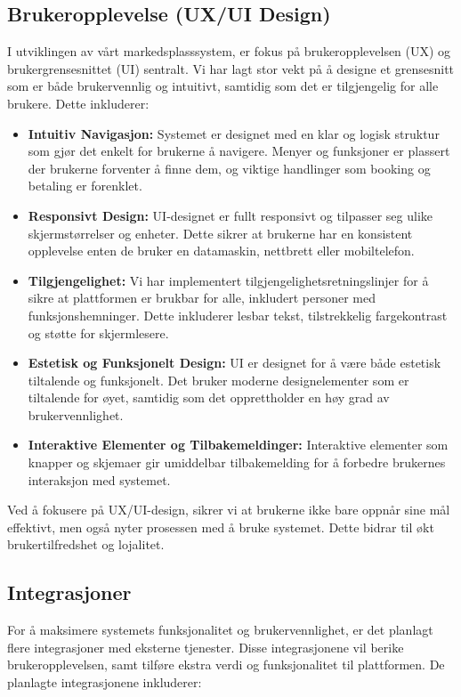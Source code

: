 \documentclass[../doc.tex]{subfiles}
\begin{document}
\subsection{Brukeropplevelse (UX/UI Design)}
I utviklingen av vårt markedsplasssystem, er fokus på brukeropplevelsen (UX) og brukergrensesnittet (UI) sentralt. Vi har lagt stor vekt på å designe et grensesnitt som er både brukervennlig og intuitivt, samtidig som det er tilgjengelig for alle brukere. Dette inkluderer:

\begin{itemize}
    \item \textbf{Intuitiv Navigasjon:} Systemet er designet med en klar og logisk struktur som gjør det enkelt for brukerne å navigere. 
    Menyer og funksjoner er plassert der brukerne forventer å finne dem, og viktige handlinger som booking og betaling er forenklet.

    \item \textbf{Responsivt Design:} UI-designet er fullt responsivt og tilpasser seg ulike skjermstørrelser og enheter. 
    Dette sikrer at brukerne har en konsistent opplevelse enten de bruker en datamaskin, nettbrett eller mobiltelefon.

    \item \textbf{Tilgjengelighet:} Vi har implementert tilgjengelighetsretningslinjer for å sikre at plattformen er brukbar for alle, inkludert personer med funksjonshemninger. 
    Dette inkluderer lesbar tekst, tilstrekkelig fargekontrast og støtte for skjermlesere.

    \item \textbf{Estetisk og Funksjonelt Design:} UI er designet for å være både estetisk tiltalende og funksjonelt. 
    Det bruker moderne designelementer som er tiltalende for øyet, samtidig som det opprettholder en høy grad av brukervennlighet.

    \item \textbf{Interaktive Elementer og Tilbakemeldinger:} Interaktive elementer som knapper og skjemaer gir umiddelbar tilbakemelding for å forbedre brukernes interaksjon med systemet.
\end{itemize}

Ved å fokusere på UX/UI-design, sikrer vi at brukerne ikke bare oppnår sine mål effektivt, men også nyter prosessen med å bruke systemet. Dette bidrar til økt brukertilfredshet og lojalitet.

\subsection{Integrasjoner}
For å maksimere systemets funksjonalitet og brukervennlighet, er det planlagt flere integrasjoner med eksterne tjenester. Disse integrasjonene vil berike brukeropplevelsen, samt tilføre ekstra verdi og funksjonalitet til plattformen. De planlagte integrasjonene inkluderer:
\end{document}
